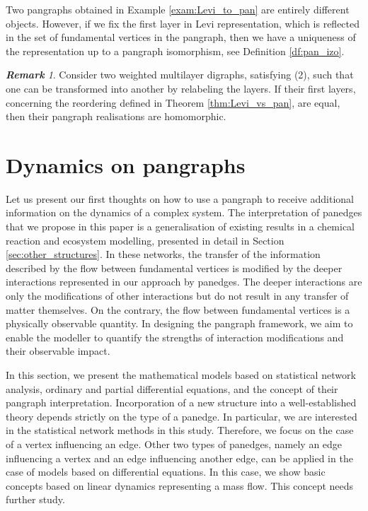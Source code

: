 \documentclass[a4paper,12pt]{article}
\theoremstyle{definition}
\theoremstyle{remark}
\newtheorem{rem}{\small\bf Remark}
\begin{document}
Two pangraphs obtained in Example \ref{exam:Levi_to_pan} are entirely different objects. However, if we fix the first layer in Levi representation, which is reflected in the set of fundamental vertices in the pangraph, then we have a uniqueness of the representation up to a pangraph isomorphism, see Definition \ref{df:pan_izo}. 

\begin{rem}
Consider two weighted multilayer digraphs, satisfying (2), such that one can be transformed into another by relabeling the layers. If their first layers, concerning the reordering defined in Theorem \ref{thm:Levi_vs_pan}, are equal, then their pangraph realisations are homomorphic.
\end{rem}

\section{Dynamics on pangraphs}\label{sec:pan_dynamics}

Let us present our first thoughts on how to use a pangraph to receive additional information on the dynamics of a complex system. The interpretation of panedges that we propose in this paper is a generalisation of existing results in a chemical reaction and ecosystem modelling, presented in detail in Section \ref{sec:other_structures}. In these networks, the transfer of the information described by the flow between fundamental vertices is modified by the deeper interactions represented in our approach by panedges. The deeper interactions are only the modifications of other interactions but do not result in any transfer of matter themselves. On the contrary, the flow between fundamental vertices is a physically observable quantity. In designing the pangraph framework, we aim to enable the modeller to quantify the strengths of interaction modifications and their observable impact. 

In this section, we present the mathematical models based on statistical network analysis, ordinary and partial differential equations, and the concept of their pangraph interpretation. Incorporation of a new structure into a well-established theory depends strictly on the type of a panedge. In
particular, we are interested in the statistical network methods in this study. Therefore, we focus on the case of a vertex influencing an edge. Other two types of panedges, namely an edge influencing a vertex and an edge influencing another edge, can be applied in the case of models based on differential equations. In this case, we show basic concepts based on linear dynamics representing a mass flow. This concept needs further study.
\end{document}
